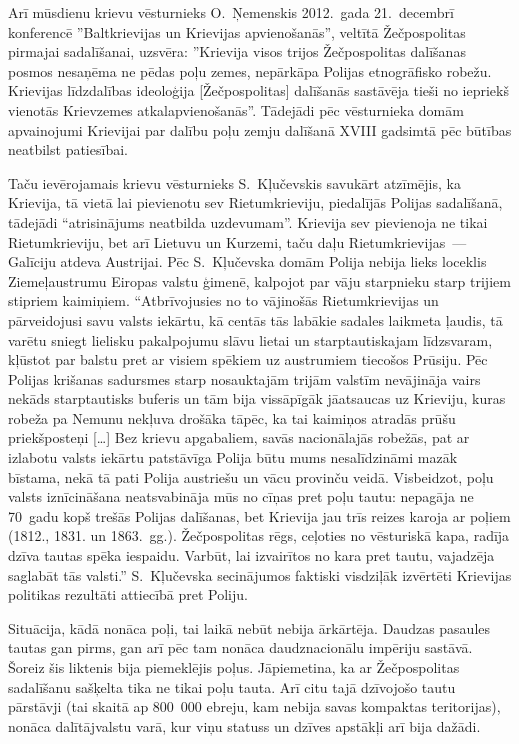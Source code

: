 \documentclass[twoside,a5paper,12pt,fleqn,openany]{extbook}
\newcommand{\citespace}{[\dots{}]}
\begin{document}
Arī mūsdienu krievu vēsturnieks O.~Ņemenskis 2012.~gada 21.~decembrī konferencē ''Baltkrievijas un Krievijas apvienošanās'', veltītā Žečpospolitas pirmajai sadalīšanai, uzsvēra: ''Krievija visos trijos Žečpospolitas dalīšanas posmos nesaņēma ne pēdas poļu zemes, nepārkāpa Polijas etnogrāfisko robežu. Krievijas līdzdalības ideoloģija [Žečpospolitas] dalīšanās sastāvēja tieši no iepriekš vienotās Krievzemes atkalapvienošanās''. Tādejādi pēc vēsturnieka domām apvainojumi Krievijai par dalību poļu zemju dalīšanā XVIII gadsimtā pēc būtības neatbilst patiesībai.

Taču ievērojamais krievu vēsturnieks S.~Kļučevskis savukārt atzīmējis, ka Krievija, tā vietā lai pievienotu sev Rietumkrieviju, piedalījās Polijas sadalīšanā, tādejādi ``atrisinājums neatbilda uzdevumam''. Krievija sev pievienoja ne tikai Rietumkrieviju, bet arī Lietuvu un Kurzemi, taču daļu Rietumkrievijas~--- Galīciju atdeva Austrijai. Pēc S.~Kļučevska domām Polija nebija lieks loceklis Ziemeļaustrumu Eiropas valstu ģimenē, kalpojot par vāju starpnieku starp trijiem stipriem kaimiņiem. ``Atbrīvojusies no to vājinošās Rietumkrievijas un pārveidojusi savu valsts iekārtu, kā centās tās labākie sadales laikmeta ļaudis, tā varētu sniegt lielisku pakalpojumu slāvu lietai un starptautiskajam līdzsvaram, kļūstot par balstu pret ar visiem spēkiem uz austrumiem tiecošos Prūsiju. Pēc Polijas krišanas sadursmes starp nosauktajām trijām valstīm nevājināja vairs nekāds starptautisks buferis un tām bija vissāpīgāk jāatsaucas uz Krieviju, kuras robeža pa Nemunu nekļuva drošāka tāpēc, ka tai kaimiņos atradās prūšu priekšposteņi \citespace{} Bez krievu apgabaliem, savās nacionālajās robežās, pat ar izlabotu valsts iekārtu patstāvīga Polija būtu mums nesalīdzināmi mazāk bīstama, nekā tā pati Polija austriešu un vācu provinču veidā. Visbeidzot, poļu valsts iznīcināšana neatsvabināja mūs no cīņas pret poļu tautu: nepagāja ne 70~gadu kopš trešās Polijas dalīšanas, bet Krievija jau trīs reizes karoja ar poļiem (1812., 1831. un 1863.~gg.). Žečpospolitas rēgs, ceļoties no vēsturiskā kapa, radīja dzīva tautas spēka iespaidu. Varbūt, lai izvairītos no kara pret tautu, vajadzēja saglabāt tās valsti.'' S.~Kļučevska secinājumos faktiski visdziļāk izvērtēti Krievijas politikas rezultāti attiecībā pret Poliju.

Situācija, kādā nonāca poļi, tai laikā nebūt nebija ārkārtēja. Daudzas pasaules tautas gan pirms, gan arī pēc tam nonāca daudznacionālu impēriju sastāvā. Šoreiz šis liktenis bija piemeklējis poļus. Jāpiemetina, ka ar Žečpospolitas sadalīšanu sašķelta tika ne tikai poļu tauta. Arī citu tajā dzīvojošo tautu pārstāvji (tai skaitā ap 800~000 ebreju, kam nebija savas kompaktas teritorijas), nonāca dalītājvalstu varā, kur viņu statuss un dzīves apstākļi arī bija dažādi.
\end{document}
